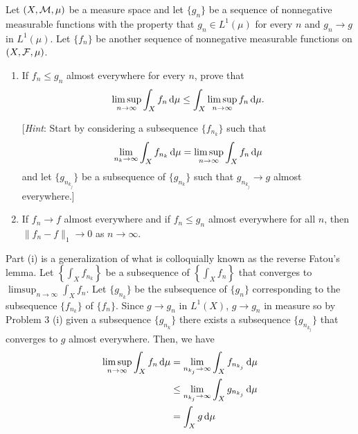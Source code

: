 \begin{problem}
  Let $(X,\mathcal{M},\mu)$ be a measure space and let $\{g_n\}$ be a sequence of
  nonnegative measurable functions with the property that $g_n\in L^1(\mu)$
  for every $n$ and $g_n\to g$ in $L^1(\mu)$. Let $\{f_n\}$ be another
  sequence of nonnegative measurable functions on $(X,\mathcal{F},\mu)$.
  \begin{enumerate}[label=(\roman*),noitemsep]
  \item If $f_n\leq g_n$ almost everywhere for every $n$, prove that
    \[
      \limsup_{n\to\infty}\int_X
      f_n\mathop{}\!\mathrm{d}\mu\leq\int_X\limsup_{n\to\infty}f_n\mathop{}\!\mathrm{d}\mu.
    \]

    [\emph{Hint}: Start by considering a subsequence $\{f_{n_k}\}$ such
    that
    \[
      \lim_{n_k\to\infty}\int_X
      f_{n_k}\mathop{}\!\mathrm{d}\mu=\limsup_{n\to\infty}\int_X f_n\mathop{}\!\mathrm{d}\mu
    \]
    and let $\{g_{n_{k_j}}\}$ be a subsequence of $\{g_{n_k}\}$ such
    that $g_{n_{k_j}}\to g$ almost everywhere.]
  \item If $f_n\to f$ almost everywhere and if $f_n\leq g_n$ almost
    everywhere for all $n$, then $\|f_n-f\|_1\to 0$ as $n\to\infty$.
  \end{enumerate}
\end{problem}
\begin{solution}
  Part (i) is a generalization of what is colloquially known as the reverse
  Fatou's lemma. Let $\left\{\int_X f_{n_k}\right\}$ be a subsequence of
  $\left\{\int_X f_n\right\}$ that converges to
  $\limsup_{n\to\infty}\int_X f_n$. Let $\{g_{n_k}\}$ be the subsequence of
  $\{g_n\}$ corresponding to the subsequence $\{f_{n_k}\}$ of
  $\{f_n\}$. Since $g\to g_n$ in $L^1(X)$, $g\to g_n$ in measure so by
  Problem 3 (i) given a subsequence $\{g_{n_k}\}$ there exists a
  subsequence $\{g_{n_{k_j}}\}$ that converges to $g$ almost
  everywhere. Then, we have
  \begin{align*}
    \limsup_{n\to\infty}\int_X f_n\diff\mu%
    &=\lim_{n_{k_j}\to\infty}\int_X f_{n_{k_j}}\diff\mu\\
    &\leq\lim_{n_{k_j}\to\infty}\int_X g_{n_{k_j}}\diff\mu\\
    &=\int_X g\diff\mu
  \end{align*}
\end{solution}

